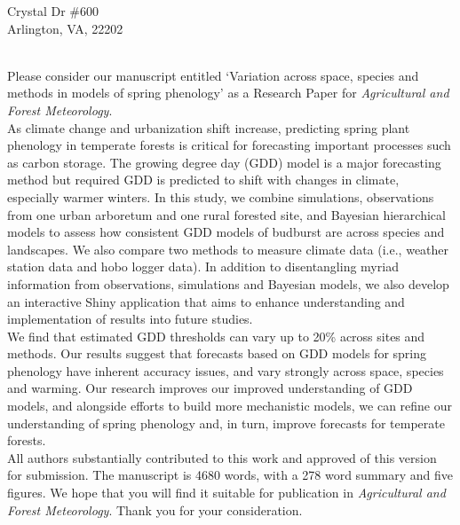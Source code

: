 \documentclass[11pt,a4paper]{article}\usepackage[]{graphicx}\usepackage[]{color}
\begin{document}
 Crystal Dr \#600\\
\noindent Arlington, VA, 22202\\

\vspace{1.5ex}


\vspace{3ex}\\
\noindent Please consider our manuscript entitled `Variation across space, species and methods in models of spring phenology' as a Research Paper for \textit{Agricultural and Forest Meteorology}. \\

\noindent As climate change and urbanization shift increase, predicting spring plant phenology in temperate forests is critical for forecasting important processes such as carbon storage. The growing degree day (GDD) model is a major forecasting method but required GDD is predicted to shift with changes in climate, especially warmer winters. In this study, we combine simulations, observations from one urban arboretum and one rural forested site, and Bayesian hierarchical models to assess how consistent GDD models of budburst are across species and landscapes. We also compare two methods to measure climate data (i.e., weather station data and hobo logger data). In addition to disentangling myriad information from observations, simulations and Bayesian models, we also develop an interactive Shiny application that aims to enhance understanding and implementation of results into future studies. \\

\noindent We find that estimated GDD thresholds can vary up to 20\% across sites and methods. Our results suggest that forecasts based on GDD models for spring phenology have inherent accuracy issues, and vary strongly across space, species and warming. Our research improves our improved understanding of GDD models, and alongside efforts to build more mechanistic models, we can refine our understanding of spring phenology and, in turn, improve forecasts for temperate forests. \\

\noindent All authors substantially contributed to this work and approved of this version for submission. The manuscript is 4680 words, with a 278 word summary and five figures. We hope that you will find it suitable for publication in \textit{Agricultural and Forest Meteorology}. Thank you for your consideration. \\
\end{document}
